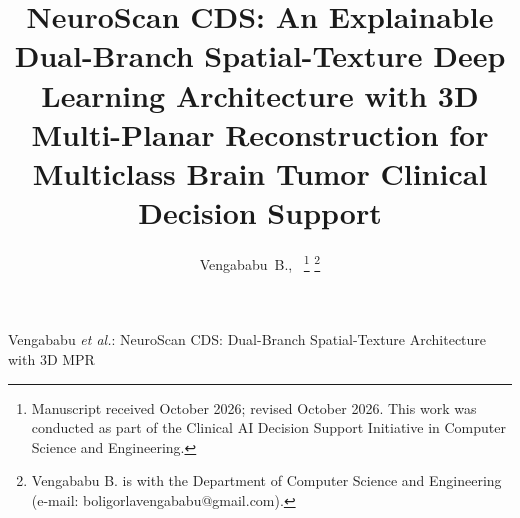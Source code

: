 \documentclass[journal,twocolumn,10pt]{IEEEtran}
\begin{document}
\title{NeuroScan CDS: An Explainable Dual-Branch Spatial-Texture Deep Learning Architecture with 3D Multi-Planar Reconstruction for Multiclass Brain Tumor Clinical Decision Support}

\author{Vengababu~B.,~
\thanks{Manuscript received October 2026; revised October 2026. This work was conducted as part of the Clinical AI Decision Support Initiative in Computer Science and Engineering.}
\thanks{Vengababu B. is with the Department of Computer Science and Engineering (e-mail: boligorlavengababu@gmail.com).}
}

%
{Vengababu \MakeLowercase{\textit{et al.}}: NeuroScan CDS: Dual-Branch Spatial-Texture Architecture with 3D MPR}

\maketitle
\end{document}
